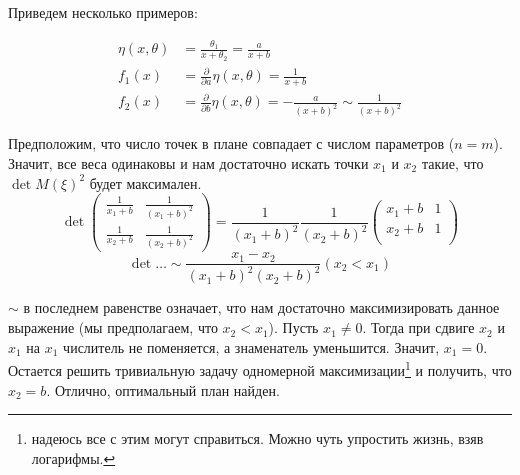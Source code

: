 Приведем несколько примеров:
\begin{ex}
\begin{equation}
\label{rationExm1}
\begin{split}
\eta(x,\theta) &= \frac{\theta_1}{x+\theta_2} = \frac{a}{x+b}\\
f_1(x) &= \frac{\partial}{\partial{a}}\eta(x,\theta) = \frac{1}{x+b}\\
f_2(x) &= \frac{\partial}{\partial{b}} \eta(x,\theta) = -\frac{a}{(x+b)^2} \sim \frac{1}{(x+b)^2}
\end{split}
\end{equation}

Предположим, что число точек в плане совпадает с числом параметров ($n=m$). Значит, все веса одинаковы и нам достаточно искать точки $x_1$ и $x_2$ такие, что $\det M(\xi)^2$ будет максимален.
\begin{equation}
\det \begin{pmatrix} \frac{1}{x_1 + b} & \frac{1}{(x_1+b)^2} \\ 
\frac{1}{x_2 + b} & \frac{1}{(x_2 + b)^2}
\end{pmatrix} = \frac{1}{(x_1+b)^2}\frac{1}{(x_2+b)^2}\begin{pmatrix}
x_1 + b & 1 \\ 
x_2 + b & 1 \\
\end{pmatrix}
\end{equation}
\begin{equation*}
\det … \sim \frac{x_1 - x_2}{(x_1+b)^2(x_2+b)^2} (x_2 < x_1)
\end{equation*}

$\sim$ в последнем равенстве означает, что нам достаточно максимизировать данное выражение (мы предполагаем, что $x_2 < x_1$). Пусть $x_1 \neq 0$. Тогда при сдвиге $x_2$ и $x_1$ на $x_1$ числитель не поменяется, а знаменатель уменьшится. Значит, $x_1 = 0$. Остается решить тривиальную задачу одномерной максимизации\footnote{надеюсь все с этим могут справиться. Можно чуть упростить жизнь, взяв логарифмы.} и получить, что $x_2 = b$.
Отлично, оптимальный план найден.

\end{ex}

